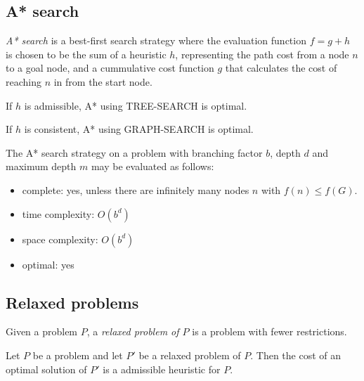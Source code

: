\documentclass{article}
\begin{document}
\subsection{A* search}

\begin{definition}
    \emph{A* search} is a best-first search strategy where the evaluation
    function $f=g+h$ is chosen to be the sum of a heuristic $h$, representing the
    path cost from a node $n$ to a goal node, and a cummulative 
    cost function $g$ that calculates the cost of reaching $n$
    in from the start node.
\end{definition}


\begin{theorem}
    If $h$ is admissible, A* using TREE-SEARCH is optimal.
\end{theorem}

\begin{theorem}
    If $h$ is consistent, A* using GRAPH-SEARCH is optimal.
\end{theorem}

\begin{theorem}
    The A* search strategy on a problem with branching factor $b$, depth $d$
    and maximum depth $m$ may be evaluated as follows:
    \begin{itemize}
        \item complete: yes, unless there are infinitely many nodes $n$ with $f(n) \leq f(G)$.
        \item time complexity: $O(b^d)$
        \item space complexity: $O(b^d)$
        \item optimal: yes
    \end{itemize}
\end{theorem}

\subsection{Relaxed problems}

\begin{definition}
    Given a problem $P$, a \emph{relaxed problem of $P$} is a problem with
    fewer restrictions.
\end{definition}

\begin{theorem}
    Let $P$ be a problem and let $P'$ be a relaxed problem of $P$. Then
    the cost of an optimal solution of $P'$ is a admissible heuristic
    for $P$.
\end{theorem}
\end{document}
